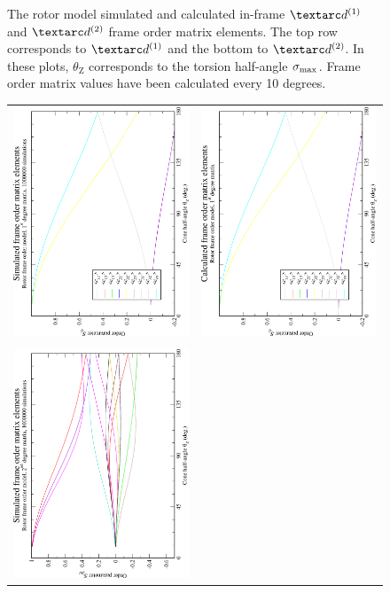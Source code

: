 \begin{figure}
\begin{tabular}{@{}cc@{}}
  \end{tabular}
  \caption[Rotor simulated and calculated in-frame Daeg$^{(1)}$ and Daeg$^{(2)}$ elements.]{
    The rotor model simulated and calculated in-frame $\FOone$ and $\FOtwo$ frame order matrix elements.
    The top row corresponds to $\FOone$ and the bottom to $\FOtwo$.
    In these plots, $\theta_\textrm{Z}$ corresponds to the torsion half-angle $\sigma_\textrm{max}$.
    Frame order matrix values have been calculated every 10 degrees.
  }
  \label{fig: simulated and calculated in-frame 1st and 2nd degree rotor frame order}
\end{figure}

\begin{figure}
\centering
  \begin{tabular}{@{}cc@{}}
    \includegraphics[width=.35\textwidth,angle=270]{images/frame_order_matrix/Sij_rotor_out_of_frame_theta_z_ens1000000.eps} &
    \includegraphics[width=.35\textwidth,angle=270]{images/frame_order_matrix/Sij_rotor_out_of_frame_theta_z_calc.eps} \\
    \\[-5pt]
    \includegraphics[width=.35\textwidth,angle=270]{images/frame_order_matrix/Sijkl_rotor_out_of_frame_theta_z_ens1000000.eps} &

\end{tabular}
\end{figure}
